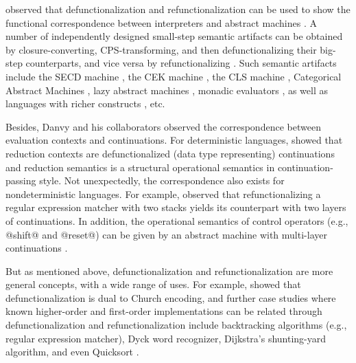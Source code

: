 \documentclass[acmsmall, screen]{acmart}\settopmatter{}
\begin{document}
 observed that defunctionalization and refunctionalization
can be used to show the functional correspondence between interpreters and abstract machines
\cite{Ager:2003:FCE:888251.888254}. A number of independently designed small-step semantic artifacts can
be obtained by closure-converting, CPS-transforming, and then defunctionalizing their big-step counterparts,
and vice versa by refunctionalizing \cite{DANVY2009534}.
Such semantic artifacts include the SECD machine \cite{10.1007/11431664_4, Ager:2003:FCE:888251.888254, DanvySECDJ},
the CEK machine \cite{Ager:2003:FCE:888251.888254}, the CLS machine  \cite{Ager:2003:FCE:888251.888254},
Categorical Abstract Machines \cite{Ager:2003:FCE:888251.888254}, lazy abstract machines \cite{AGER2004223},
monadic evaluators \cite{ager2005functional}, as well as languages with richer constructs
\cite{Danvy:2008:DIP:1411204.1411206, danvy2009towards, biernacka2009towards}, etc.

Besides, Danvy and his collaborators observed the correspondence between evaluation contexts and continuations.
For deterministic languages, \citet{Danvy:2008:DIP:1411204.1411206} showed that reduction contexts
are defunctionalized (data type representing) continuations and reduction semantics is a structural
operational semantics in continuation-passing style.
Not unexpectedly, the correspondence also exists for nondeterministic languages. For example,
\citet{Danvy:2001:DW:773184.773202} observed that refunctionalizing a regular expression matcher
with two stacks yields its counterpart with two layers of continuations.
In addition, the operational semantics of control operators (e.g., @shift@ and @reset@) can be given by an
abstract machine with multi-layer continuations \cite{Danvy:1990:AC:91556.91622, lmcs:2269}.

But as mentioned above, defunctionalization and refunctionalization are more general concepts,
with a wide range of uses. For example, \citet{Danvy:2001:DW:773184.773202} showed that
defunctionalization is dual to Church encoding, and further case studies where known
higher-order and first-order implementations can be related through defunctionalization
and refunctionalization include backtracking algorithms (e.g., regular expression matcher),
Dyck word recognizer, Dijkstra's shunting-yard algorithm, and even Quicksort
\cite{Danvy:2006:RW:2171265.2171268, DANVY2009534, Danvy:2001:DW:773184.773202}. \\

\end{document}
